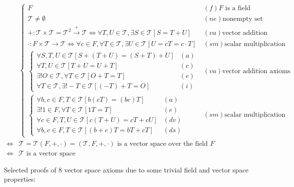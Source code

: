 \documentclass[
]{book}
\theoremstyle{definition}
\theoremstyle{definition}
\theoremstyle{definition}
\theoremstyle{definition}
\theoremstyle{remark}
\begin{document}
\[
\begin{aligned}
 & \begin{cases}
F & \left(f\right)F\text{ is a field}\\
\mathcal{T}\ne\emptyset & \left(ne\right)\text{nonempty set}\\
+:\mathcal{T}\times\mathcal{T}=\mathcal{T}^{2}\overset{+}{\rightarrow}\mathcal{T}\Leftrightarrow\forall T,U\in\mathcal{T},\exists S\in\mathcal{T}\left[S=T+U\right] & \left(va\right)\text{vector addition}\\
\cdot:F\times\mathcal{T}\overset{\cdot}{\rightarrow}\mathcal{T}\Leftrightarrow\forall c\in F,\forall T\in\mathcal{T},\exists U\in\mathcal{T}\left[U=cT=c\cdot T\right] & \left(sm\right)\text{scalar multiplication}\\
\begin{cases}
\forall S,T,U\in\mathcal{T}\left[S+\left(T+U\right)=\left(S+T\right)+U\right] & \left(a\right)\\
\forall T,U\in\mathcal{T}\left[T+U=U+T\right] & \left(c\right)\\
\exists!O\in\mathcal{T},\forall T\in\mathcal{T}\left[O+T=T\right] & \left(e\right)\\
\forall T\in\mathcal{T},\exists!-T\in\mathcal{T}\left[\left(-T\right)+T=O\right] & \left(i\right)
\end{cases} & \left(va\right)\text{vector addition axioms}\\
\begin{cases}
\forall b,c\in F,T\in\mathcal{T}\left[b\left(cT\right)=\left(bc\right)T\right] & \left(a\right)\\
\exists!1\in F,\forall T\in\mathcal{T}\left[1T=T\right] & \left(e\right)\\
\forall c\in F,T,U\in\mathcal{T}\left[c\left(T+U\right)=cT+cU\right] & \left(dv\right)\\
\forall b,c\in F,T\in\mathcal{T}\left[\left(b+c\right)T=bT+cT\right] & \left(ds\right)
\end{cases} & \left(sm\right)\text{scalar multiplication axioms}
\end{cases}\\
\Leftrightarrow & \mathcal{T}=\mathcal{T}\left(F,+,\cdot\right)=\left(\mathcal{T},F,+,\cdot\right)\text{ is a vector space over the field }F\\
\Leftrightarrow & \mathcal{T}\text{ is a vector space}
\end{aligned}
\]

Selected proofs of 8 vector space axioms due to some trivial field and vector space properties:
\end{document}
